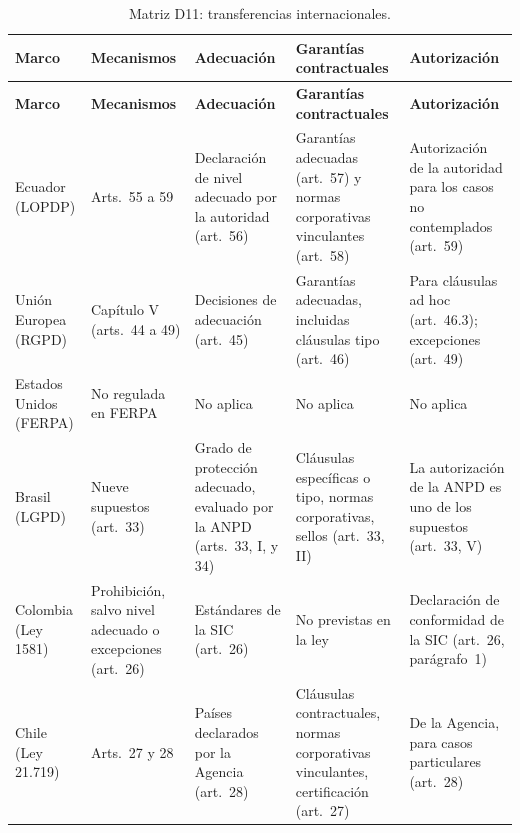 {\scriptsize
\renewcommand{\arraystretch}{1.12}
\begin{xltabular}{\textwidth}{|>{\raggedright\arraybackslash}p{2.0cm}|L|L|L|L|}
  \caption{Matriz D11: transferencias internacionales.}
  \label{tab:matriz_d11} \\
  \hline
  \textbf{Marco} & \textbf{Mecanismos} & \textbf{Adecuación} & \textbf{Garantías contractuales} & \textbf{Autorización} \\
  \hline
  \endfirsthead
  \hline
  \textbf{Marco} & \textbf{Mecanismos} & \textbf{Adecuación} & \textbf{Garantías contractuales} & \textbf{Autorización} \\
  \hline
  \endhead
  \hline
  \endlastfoot
  Ecuador (LOPDP) & Arts.~55 a 59 & Declaración de nivel adecuado por la autoridad (art.~56) & Garantías adecuadas (art.~57) y normas corporativas vinculantes (art.~58) & Autorización de la autoridad para los casos no contemplados (art.~59) \\ \hline
  Unión Europea (RGPD) & Capítulo V (arts.~44 a 49) \cite{rgpd2016} & Decisiones de adecuación (art.~45) & Garantías adecuadas, incluidas cláusulas tipo (art.~46) & Para cláusulas ad hoc (art.~46.3); excepciones (art.~49) \\ \hline
  Estados Unidos (FERPA) & No regulada en FERPA & No aplica & No aplica & No aplica \\ \hline
  Brasil (LGPD) & Nueve supuestos (art.~33) & Grado de protección adecuado, evaluado por la ANPD (arts.~33, I, y 34) & Cláusulas específicas o tipo, normas corporativas, sellos (art.~33, II) & La autorización de la ANPD es uno de los supuestos (art.~33, V) \\ \hline
  Colombia (Ley 1581) & Prohibición, salvo nivel adecuado o excepciones (art.~26) & Estándares de la SIC (art.~26) & No previstas en la ley & Declaración de conformidad de la SIC (art.~26, parágrafo~1) \\ \hline
  Chile (Ley 21.719) & Arts.~27 y 28 & Países declarados por la Agencia (art.~28) & Cláusulas contractuales, normas corporativas vinculantes, certificación (art.~27) & De la Agencia, para casos particulares (art.~28) \\ \hline
\end{xltabular}
}

